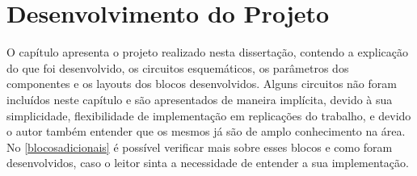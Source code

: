 \chapter[Desenvolvimento do Projeto]{Desenvolvimento do Projeto}

O capítulo apresenta o projeto realizado nesta dissertação, contendo a explicação do que foi desenvolvido, os circuitos esquemáticos, os parâmetros dos componentes e os layouts dos blocos desenvolvidos. Alguns circuitos não foram incluídos neste capítulo e são apresentados de maneira implícita, devido à sua simplicidade, flexibilidade de implementação em replicações do trabalho, e devido o autor também entender que os mesmos já são de amplo conhecimento na área. No \autoref{blocosadicionais} é possível verificar mais sobre esses blocos e como foram desenvolvidos, caso o leitor sinta a necessidade de entender a sua implementação.

\newcommand{\NomeBloco}{NULL}
\newcommand{\NomeBlocoNoIt}{NULL}
\newcommand{\NomeBlocoNoUnderline}{NULL}
\newcommand{\NomePTab}{tab_\NomeBlocoNoUnderline}
\newcommand{\NomeSTab}{tab_\NomeBlocoNoUnderline2}
\newcommand{\NomePFig}{fig_\NomeBlocoNoUnderline}
\newcommand{\NomeSFig}{fig_\NomeBlocoNoUnderline2}
\newcommand{\NomeTTab}{tab_\NomeBlocoNoUnderline3}
\newcommand{\NomeQTab}{tab_\NomeBlocoNoUnderline4}














